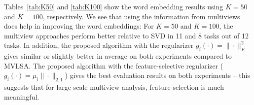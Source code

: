 \documentclass[10pt,journal]{IEEEtran}
\begin{document}
Tables~\ref{tab:K50} and \ref{tab:K100} show the word embedding results using $K=50$ and $K=100$, respectively.
We see that using the information from multiviews does help in improving the word embeddings:
For $K=50$ and $K=100$, the multiview approaches perform better relative to SVD in 11 and 8 tasks out of 12 tasks. 
In addition, the proposed algorithm with the regularizer $g_i(\cdot)=\|\cdot\|_F^2$ gives similar or slightly better in average on both experiments compared to MVLSA.
The proposed algorithm with the feature-selective regularizer ($g_i(\cdot)=\mu_i\|\cdot\|_{2,1}$) gives the best evaluation results on both experiments -- this suggests that for large-scale multiview analysis, feature selection is much meaningful.


\begin{table}[htbp]
  \centering
  \caption{Evaluation on 12 word embedding tasks; $K=50$.}
  \label{tab:K50}%
\end{table}%
\end{document}
